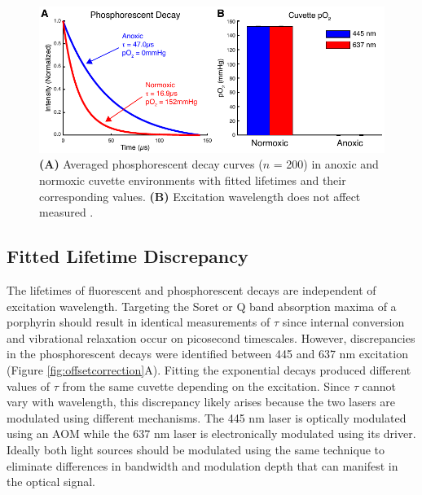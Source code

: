 \begin{figure}
    \includegraphics{figures/chapter_2/cuvette.pdf}
    \caption {
        \label{fig:cuvette}
        \textbf{(A)} Averaged phosphorescent decay curves ($n$ = 200) in anoxic and normoxic cuvette environments with fitted lifetimes and their corresponding  values. \textbf{(B)} Excitation wavelength does not affect measured .
    }
\end{figure}

\subsection{Fitted Lifetime Discrepancy}

The lifetimes of fluorescent and phosphorescent decays are independent of excitation wavelength. Targeting the Soret or Q band absorption maxima of a porphyrin should result in identical measurements of $\tau$ since internal conversion and vibrational relaxation occur on picosecond timescales. However, discrepancies in the phosphorescent decays were identified between 445 and 637 nm excitation (Figure \ref{fig:offsetcorrection}A). Fitting the exponential decays produced different values of $\tau$ from the same cuvette depending on the excitation. Since $\tau$ cannot vary with wavelength, this discrepancy likely arises because the two lasers are modulated using different mechanisms. The 445 nm laser is optically modulated using an AOM while the 637 nm laser is electronically modulated using its driver. Ideally both light sources should be modulated using the same technique to eliminate differences in bandwidth and modulation depth that can manifest in the optical signal.

